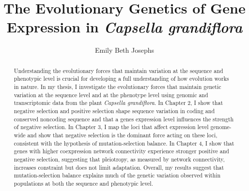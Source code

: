 \documentclass{ut-thesis}
\author{Emily Beth Josephs}
\title{The Evolutionary Genetics of Gene Expression in \textit{Capsella grandiflora}}
\begin{document}
\begin{preliminary}

\maketitle

\cleardoublepage

\begin{abstract}
Understanding the evolutionary forces that maintain variation at the sequence and phenotypic level is crucial for developing a full understanding of how evolution works in nature. In my thesis, I investigate the evolutionary forces that maintain genetic variation at the sequence level and at the phenotype level using genomic and transcriptomic data from the plant \textit{Capsella grandiflora}. In Chapter 2, I show that negative selection and positive selection shape sequence variation in coding and conserved noncoding sequence and that a gene\textsc{}s expression level influences the strength of negative selection. In Chapter 3, I map the loci that affect expression level genome-wide and show that negative selection is the dominant force acting on these loci, consistent with the hypothesis of mutation-selection balance. In Chapter 4, I show that genes with higher coexpression network connectivity experience stronger positive and negative selection, suggesting that pleiotropy, as measured by network connectivity, increases constraint but does not limit adaptation. Overall, my results suggest that mutation-selection balance explains much of the genetic variation observed within populations at both the sequence and phenotypic level.
\end{abstract}



\end{preliminary}
\end{document}
